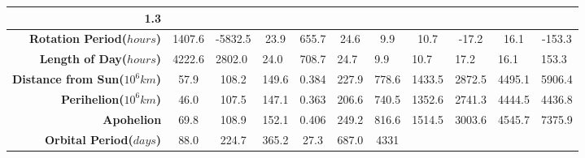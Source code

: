 \begin{landscape}
\begin{table}[H]
\begin{tabular}{|r|c|c|c|c|c|c|c|c|c|c|}
  \cellcolor[HTML]{FFFFFF}1.3 \\ \hline
\textbf{Rotation Period($hours$)} &
  \cellcolor[HTML]{F5F5F5}1407.6 &
  \cellcolor[HTML]{FFFFFF}-5832.5 &
  \cellcolor[HTML]{F5F5F5}23.9 &
  \cellcolor[HTML]{FFFFFF}655.7 &
  \cellcolor[HTML]{F5F5F5}24.6 &
  \cellcolor[HTML]{FFFFFF}9.9 &
  \cellcolor[HTML]{F5F5F5}10.7 &
  \cellcolor[HTML]{FFFFFF}-17.2 &
  \cellcolor[HTML]{F5F5F5}16.1 &
  \cellcolor[HTML]{FFFFFF}-153.3 \\ \hline
\textbf{Length of Day($hours$)} &
  \multicolumn{1}{l|}{\cellcolor[HTML]{F5F5F5}4222.6} &
  \multicolumn{1}{l|}{\cellcolor[HTML]{FFFFFF}2802.0} &
  \multicolumn{1}{l|}{\cellcolor[HTML]{F5F5F5}24.0} &
  \multicolumn{1}{l|}{\cellcolor[HTML]{FFFFFF}708.7} &
  \multicolumn{1}{l|}{\cellcolor[HTML]{F5F5F5}24.7} &
  \multicolumn{1}{l|}{\cellcolor[HTML]{FFFFFF}9.9} &
  \multicolumn{1}{l|}{\cellcolor[HTML]{F5F5F5}10.7} &
  \multicolumn{1}{l|}{\cellcolor[HTML]{FFFFFF}17.2} &
  \multicolumn{1}{l|}{\cellcolor[HTML]{F5F5F5}16.1} &
  \multicolumn{1}{l|}{\cellcolor[HTML]{FFFFFF}153.3} \\ \hline
\textbf{Distance from Sun($10^6km$)} &
  \cellcolor[HTML]{F5F5F5}57.9 &
  \cellcolor[HTML]{FFFFFF}108.2 &
  \cellcolor[HTML]{F5F5F5}149.6 &
  \cellcolor[HTML]{FFFFFF}0.384 &
  \cellcolor[HTML]{F5F5F5}227.9 &
  \cellcolor[HTML]{FFFFFF}778.6 &
  \cellcolor[HTML]{F5F5F5}1433.5 &
  \cellcolor[HTML]{FFFFFF}2872.5 &
  \cellcolor[HTML]{F5F5F5}4495.1 &
  \cellcolor[HTML]{FFFFFF}5906.4 \\ \hline
\textbf{Perihelion($10^6km$)} &
  \cellcolor[HTML]{F5F5F5}46.0 &
  \cellcolor[HTML]{FFFFFF}107.5 &
  \cellcolor[HTML]{F5F5F5}147.1 &
  \cellcolor[HTML]{FFFFFF}0.363 &
  \cellcolor[HTML]{F5F5F5}206.6 &
  \cellcolor[HTML]{FFFFFF}740.5 &
  \cellcolor[HTML]{F5F5F5}1352.6 &
  \cellcolor[HTML]{FFFFFF}2741.3 &
  \cellcolor[HTML]{F5F5F5}4444.5 &
  \cellcolor[HTML]{FFFFFF}4436.8 \\ \hline
\textbf{Apohelion} &
  \cellcolor[HTML]{F5F5F5}69.8 &
  \cellcolor[HTML]{FFFFFF}108.9 &
  \cellcolor[HTML]{F5F5F5}152.1 &
  \cellcolor[HTML]{FFFFFF}0.406 &
  \cellcolor[HTML]{F5F5F5}249.2 &
  \cellcolor[HTML]{FFFFFF}816.6 &
  \cellcolor[HTML]{F5F5F5}1514.5 &
  \cellcolor[HTML]{FFFFFF}3003.6 &
  \cellcolor[HTML]{F5F5F5}4545.7 &
  \cellcolor[HTML]{FFFFFF}7375.9 \\ \hline
\textbf{Orbital Period($days$)} &
  \cellcolor[HTML]{F5F5F5}88.0 &
  \cellcolor[HTML]{FFFFFF}224.7 &
  \cellcolor[HTML]{F5F5F5}365.2 &
  \cellcolor[HTML]{FFFFFF}27.3 &
  \cellcolor[HTML]{F5F5F5}687.0 &
  \cellcolor[HTML]{FFFFFF}4331 &

\end{tabular}
\end{table}
\end{landscape}
